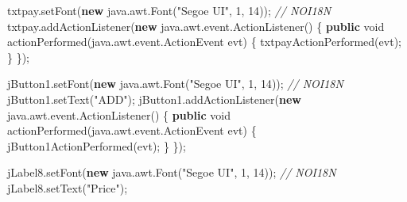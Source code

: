 \documentclass[
  10pt,
]{article}
\newenvironment{Shaded}{}{}
\newcommand{\CommentTok}[1]{\textcolor[rgb]{0.38,0.63,0.69}{\textit{#1}}}
\newcommand{\DataTypeTok}[1]{\textcolor[rgb]{0.56,0.13,0.00}{#1}}
\newcommand{\DecValTok}[1]{\textcolor[rgb]{0.25,0.63,0.44}{#1}}
\newcommand{\FunctionTok}[1]{\textcolor[rgb]{0.02,0.16,0.49}{#1}}
\newcommand{\KeywordTok}[1]{\textcolor[rgb]{0.00,0.44,0.13}{\textbf{#1}}}
\newcommand{\NormalTok}[1]{#1}
\newcommand{\OperatorTok}[1]{\textcolor[rgb]{0.40,0.40,0.40}{#1}}
\newcommand{\StringTok}[1]{\textcolor[rgb]{0.25,0.44,0.63}{#1}}
\begin{document}
\begin{Shaded}
\begin{Highlighting}[numbers=left,,]
\NormalTok{        txtpay}\OperatorTok{.}\FunctionTok{setFont}\OperatorTok{(}\KeywordTok{new}\NormalTok{ java}\OperatorTok{.}\FunctionTok{awt}\OperatorTok{.}\FunctionTok{Font}\OperatorTok{(}\StringTok{"Segoe UI"}\OperatorTok{,} \DecValTok{1}\OperatorTok{,} \DecValTok{14}\OperatorTok{));} \CommentTok{// NOI18N}
\NormalTok{        txtpay}\OperatorTok{.}\FunctionTok{addActionListener}\OperatorTok{(}\KeywordTok{new}\NormalTok{ java}\OperatorTok{.}\FunctionTok{awt}\OperatorTok{.}\FunctionTok{event}\OperatorTok{.}\FunctionTok{ActionListener}\OperatorTok{()} \OperatorTok{\{}
            \KeywordTok{public} \DataTypeTok{void} \FunctionTok{actionPerformed}\OperatorTok{(}\NormalTok{java}\OperatorTok{.}\FunctionTok{awt}\OperatorTok{.}\FunctionTok{event}\OperatorTok{.}\FunctionTok{ActionEvent}\NormalTok{ evt}\OperatorTok{)} \OperatorTok{\{}
                \FunctionTok{txtpayActionPerformed}\OperatorTok{(}\NormalTok{evt}\OperatorTok{);}
            \OperatorTok{\}}
        \OperatorTok{\});}

\NormalTok{        jButton1}\OperatorTok{.}\FunctionTok{setFont}\OperatorTok{(}\KeywordTok{new}\NormalTok{ java}\OperatorTok{.}\FunctionTok{awt}\OperatorTok{.}\FunctionTok{Font}\OperatorTok{(}\StringTok{"Segoe UI"}\OperatorTok{,} \DecValTok{1}\OperatorTok{,} \DecValTok{14}\OperatorTok{));} \CommentTok{// NOI18N}
\NormalTok{        jButton1}\OperatorTok{.}\FunctionTok{setText}\OperatorTok{(}\StringTok{"ADD"}\OperatorTok{);}
\NormalTok{        jButton1}\OperatorTok{.}\FunctionTok{addActionListener}\OperatorTok{(}\KeywordTok{new}\NormalTok{ java}\OperatorTok{.}\FunctionTok{awt}\OperatorTok{.}\FunctionTok{event}\OperatorTok{.}\FunctionTok{ActionListener}\OperatorTok{()} \OperatorTok{\{}
            \KeywordTok{public} \DataTypeTok{void} \FunctionTok{actionPerformed}\OperatorTok{(}\NormalTok{java}\OperatorTok{.}\FunctionTok{awt}\OperatorTok{.}\FunctionTok{event}\OperatorTok{.}\FunctionTok{ActionEvent}\NormalTok{ evt}\OperatorTok{)} \OperatorTok{\{}
                \FunctionTok{jButton1ActionPerformed}\OperatorTok{(}\NormalTok{evt}\OperatorTok{);}
            \OperatorTok{\}}
        \OperatorTok{\});}

\NormalTok{        jLabel8}\OperatorTok{.}\FunctionTok{setFont}\OperatorTok{(}\KeywordTok{new}\NormalTok{ java}\OperatorTok{.}\FunctionTok{awt}\OperatorTok{.}\FunctionTok{Font}\OperatorTok{(}\StringTok{"Segoe UI"}\OperatorTok{,} \DecValTok{1}\OperatorTok{,} \DecValTok{14}\OperatorTok{));} \CommentTok{// NOI18N}
\NormalTok{        jLabel8}\OperatorTok{.}\FunctionTok{setText}\OperatorTok{(}\StringTok{"Price"}\OperatorTok{);}


\end{Highlighting}
\end{Shaded}
\end{document}
